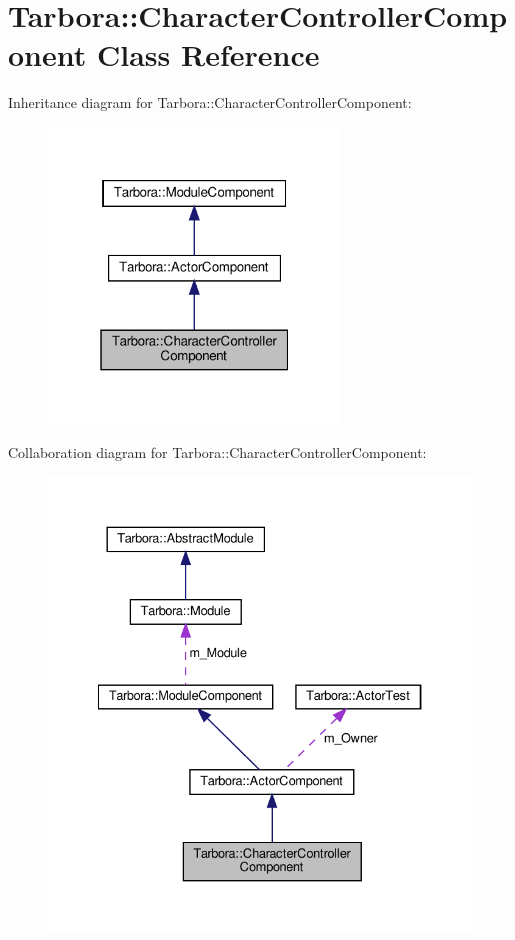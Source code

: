 \hypertarget{classTarbora_1_1CharacterControllerComponent}{}\section{Tarbora\+:\+:Character\+Controller\+Component Class Reference}
\label{classTarbora_1_1CharacterControllerComponent}


Inheritance diagram for Tarbora\+:\+:Character\+Controller\+Component\+:
\nopagebreak
\begin{figure}[H]
\begin{center}
\leavevmode
\includegraphics[width=220pt]{classTarbora_1_1CharacterControllerComponent__inherit__graph}
\end{center}
\end{figure}


Collaboration diagram for Tarbora\+:\+:Character\+Controller\+Component\+:
\nopagebreak
\begin{figure}[H]
\begin{center}
\leavevmode
\includegraphics[width=334pt]{classTarbora_1_1CharacterControllerComponent__coll__graph}
\end{center}
\end{figure}
